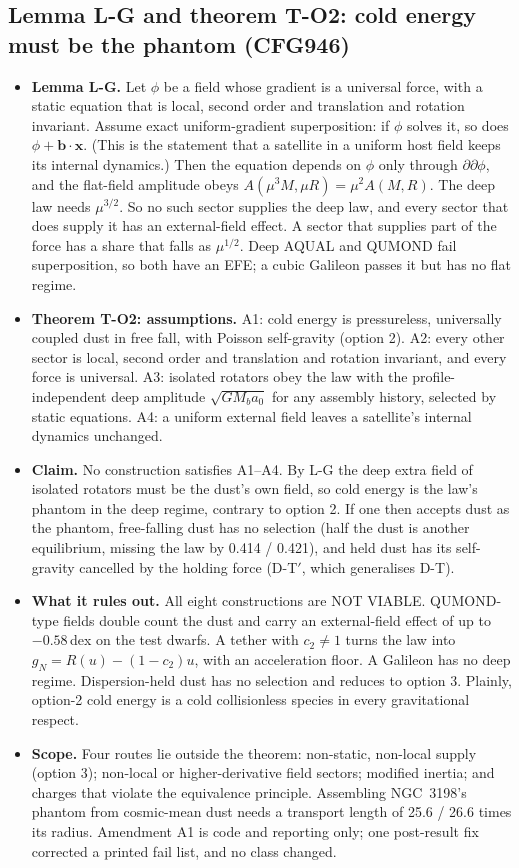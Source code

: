 \documentclass[10pt]{article}
\begin{document}
\subsection{Lemma L-G and theorem T-O2: cold energy must be the phantom (CFG946)}
\begin{itemize}
\item \textbf{Lemma L-G.} Let $\phi$ be a field whose gradient is a universal force, with a static equation that is local, second order and translation and rotation invariant. Assume exact uniform-gradient superposition: if $\phi$ solves it, so does $\phi+\mathbf b\cdot\mathbf x$. (This is the statement that a satellite in a uniform host field keeps its internal dynamics.) Then the equation depends on $\phi$ only through $\partial\partial\phi$, and the flat-field amplitude obeys $A(\mu^3M,\mu R)=\mu^2A(M,R)$. The deep law needs $\mu^{3/2}$. So no such sector supplies the deep law, and every sector that does supply it has an external-field effect. A sector that supplies part of the force has a share that falls as $\mu^{1/2}$. Deep AQUAL and QUMOND fail superposition, so both have an EFE; a cubic Galileon passes it but has no flat regime.
\item \textbf{Theorem T-O2: assumptions.} A1: cold energy is pressureless, universally coupled dust in free fall, with Poisson self-gravity (option 2). A2: every other sector is local, second order and translation and rotation invariant, and every force is universal. A3: isolated rotators obey the law with the profile-independent deep amplitude $\sqrt{GM_ba_0}$ for any assembly history, selected by static equations. A4: a uniform external field leaves a satellite's internal dynamics unchanged.
\item \textbf{Claim.} No construction satisfies A1--A4. By L-G the deep extra field of isolated rotators must be the dust's own field, so cold energy is the law's phantom in the deep regime, contrary to option 2. If one then accepts dust as the phantom, free-falling dust has no selection (half the dust is another equilibrium, missing the law by 0.414 / 0.421), and held dust has its self-gravity cancelled by the holding force (D-T$'$, which generalises D-T).
\item \textbf{What it rules out.} All eight constructions are NOT VIABLE. QUMOND-type fields double count the dust and carry an external-field effect of up to $-0.58$\,dex on the test dwarfs. A tether with $c_2\neq1$ turns the law into $g_N=R(u)-(1-c_2)u$, with an acceleration floor. A Galileon has no deep regime. Dispersion-held dust has no selection and reduces to option 3. Plainly, option-2 cold energy is a cold collisionless species in every gravitational respect.
\item \textbf{Scope.} Four routes lie outside the theorem: non-static, non-local supply (option 3); non-local or higher-derivative field sectors; modified inertia; and charges that violate the equivalence principle. Assembling NGC~3198's phantom from cosmic-mean dust needs a transport length of 25.6 / 26.6 times its radius. Amendment A1 is code and reporting only; one post-result fix corrected a printed fail list, and no class changed.
\end{itemize}
\end{document}

